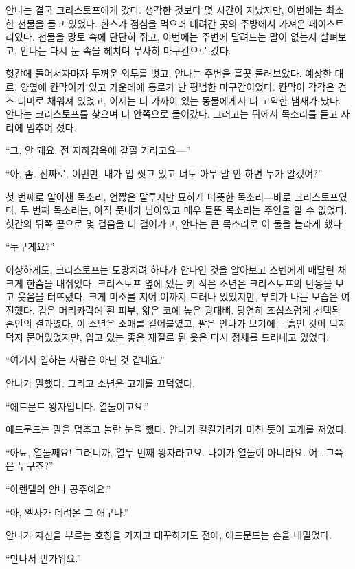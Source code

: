 안나는 결국 크리스토프에게 갔다. 생각한 것보다 몇 시간이 지났지만, 이번에는 최소한 선물을 들고 있었다. 한스가 점심을 먹으러 데려간 곳의 주방에서 가져온 페이스트리였다. 선물을 망토 속에 단단히 쥐고, 이번에는 주변에 달려드는 말이 없는지 살펴보고, 안나는 다시 눈 속을 헤치며 무사히 마구간으로 갔다.

헛간에 들어서자마자 두꺼운 외투를 벗고, 안나는 주변을 흘끗 둘러보았다. 예상한 대로, 양옆에 칸막이가 있고 가운데에 통로가 난 평범한 마구간이었다. 칸막이 각각은 건초 더미로 채워져 있었고, 이제는 더 가까이 있는 동물에게서 더 고약한 냄새가 났다. 안나는 크리스토프를 찾으며 더 안쪽으로 들어갔다. 그러고는 뒤에서 목소리를 듣고 자리에 멈추어 섰다.

``그, 안 돼요. 전 지하감옥에 갇힐 거라고요—''

``아, 좀. 진짜로, 이번만. 내가 입 씻고 있고 너도 아무 말 안 하면 누가 알겠어?''

첫 번째로 알아챈 목소리, 언짢은 말투지만 묘하게 따뜻한 목소리—바로 크리스토프였다. 두 번째 목소리는, 아직 풋내가 남아있고 매우 들뜬 목소리는 주인을 알 수 없었다. 헛간의 뒤쪽 끝으로 몇 걸음을 더 걸어가고, 안나는 큰 목소리로 이 둘을 놀라게 했다.

``누구게요?''

이상하게도, 크리스토프는 도망치려 하다가 안나인 것을 알아보고 스벤에게 매달린 채 크게 한숨을 내쉬었다. 크리스토프 옆에 있는 키 작은 소년은 크리스토프의 반응을 보고 웃음을 터뜨렸다. 크게 미소를 지어 이까지 드러나 있었지만, 부티가 나는 모습은 여전했다. 검은 머리카락에 흰 피부, 얇은 코에 높은 광대뼈. 당연히 조심스럽게 선택된 혼인의 결과였다. 이 소년은 소매를 걷어붙였고, 팔은 안나가 보기에는 흙인 것이 덕지덕지 묻어있었지만, 입고 있는 좋은 재질로 된 옷은 다시 정체를 드러내고 있었다.

``여기서 일하는 사람은 아닌 것 같네요.''

안나가 말했다. 그리고 소년은 고개를 끄덕였다.

``에드문드 왕자입니다. 열둘이고요.''

에드문드는 말을 멈추고 놀란 눈을 했다. 안나가 킬킬거리가 미친 듯이 고개를 저었다.

``아뇨, 열둘째요! 그러니까, 열두 번째 왕자라고요. 나이가 열둘이 아니라요. 어\ldots\,그쪽은 누구죠?''

``아렌델의 안나 공주예요.''

``아, 엘사가 데려온 그 애구나.''

안나가 자신을 부르는 호칭을 가지고 대꾸하기도 전에, 에드문드는 손을 내밀었다.

``만나서 반가워요.''

